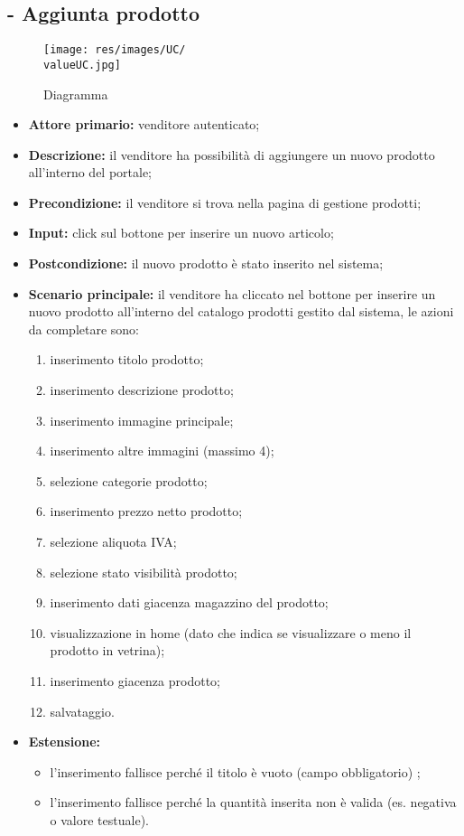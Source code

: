 \stepUserCase
\subsection{ - Aggiunta prodotto}
\begin{figure}[H]
    \centering
    \texttt{[image: res/images/UC/\\valueUC.jpg]}
    \caption{Diagramma }
\end{figure}
\begin{itemize}
    \item \textbf{Attore primario:} venditore autenticato;
    \item \textbf{Descrizione:} il venditore ha possibilità di aggiungere un nuovo prodotto all’interno del portale;
    \item \textbf{Precondizione:} il venditore si trova nella pagina di gestione prodotti;
    \item \textbf{Input:} click sul bottone per inserire un nuovo articolo;
    \item \textbf{Postcondizione:} il nuovo prodotto è stato inserito nel sistema;
    \item \textbf{Scenario principale:} il venditore ha cliccato nel bottone per inserire un nuovo prodotto all’interno del catalogo prodotti gestito dal sistema, le azioni da completare sono:
          \begin{enumerate}
              \item inserimento titolo prodotto;
              \item inserimento descrizione prodotto;
              \item inserimento immagine principale;
              \item inserimento altre immagini (massimo 4);
              \item selezione categorie prodotto;
              \item inserimento prezzo netto prodotto;
              \item selezione aliquota IVA;
              \item selezione stato visibilità prodotto;
              \item inserimento dati giacenza magazzino del prodotto;
              \item visualizzazione in home (dato che indica se visualizzare o meno il prodotto in vetrina);
              \item inserimento giacenza prodotto;
              \item salvataggio.
          \end{enumerate}
    \item \textbf{Estensione:}
          \begin{itemize}
              \item l'inserimento fallisce perché il titolo è vuoto (campo obbligatorio) ;
              \item l'inserimento fallisce perché la quantità inserita non è valida (es. negativa o valore testuale).
          \end{itemize}
\end{itemize}

